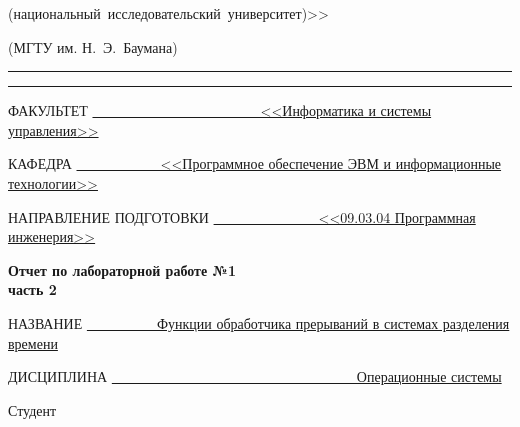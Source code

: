 \begin{titlepage}
\begin{center}
\begin{minipage}{0.85\textwidth}
{{                (национальный~исследовательский~университет)>>
            }

                {(МГТУ им. Н.~Э.~Баумана)}
                \vspace{0.1cm}
            }
        \end{minipage}

        \vspace{0.2cm}
        \rule{\linewidth}{2.8pt}
        \rule[3ex]{\linewidth}{1pt}

        \begin{flushleft}
            {ФАКУЛЬТЕТ \uline{~~~~~~~~~~~~~~~~~~~~~~~~<<Информатика и системы управления>> \hfill}}

            \vspace{0.5cm}

            {КАФЕДРА \uline{~~~~~~~~~~~~<<Программное обеспечение ЭВМ и информационные технологии>> \hfill}}
            
             \vspace{0.5cm}
              
            {НАПРАВЛЕНИЕ ПОДГОТОВКИ \uline{~~~~~~~~~~~~~~~<<09.03.04 Программная инженерия>> \hfill}}
            
        \end{flushleft}

        \vspace{2cm}

        {
           \begin{center}
           	\Large\textbf{{Отчет по лабораторной работе №1}}\\
           	\textbf{часть 2}\\
           \end{center}
        }
        \vspace{0.5cm}

		\begin{flushleft}
			{НАЗВАНИЕ \uline{~~~~~~~~~~Функции обработчика прерываний в системах разделения времени\hfill}}
			
			\vspace{0.5cm}
			
			{ДИСЦИПЛИНА \uline{~~~~~~~~~~~~~~~~~~~~~~~~~~~~~~~~~~~Операционные системы\hfill}}
			
		\end{flushleft}


        \vfill

        \begin{flushleft}
            {Студент } \hfill
            

\end{flushleft}
\end{center}
\end{titlepage}
